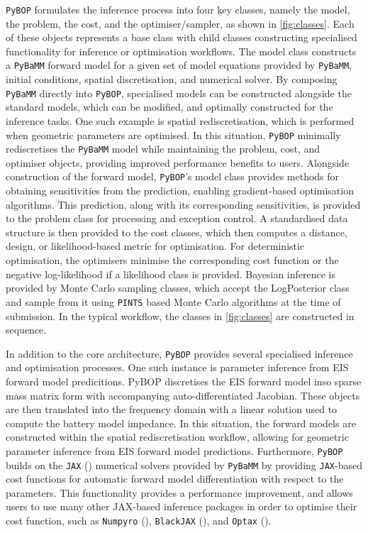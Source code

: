 \documentclass[
]{article}
\begin{document}
\texttt{PyBOP} formulates the inference process into four key classes,
namely the model, the problem, the cost, and the optimiser/sampler, as
shown in \autoref{fig:classes}. Each of these objects represents a base
class with child classes constructing specialised functionality for
inference or optimisation workflows. The model class constructs a
\texttt{PyBaMM} forward model for a given set of model equations
provided by \texttt{PyBaMM}, initial conditions, spatial discretisation,
and numerical solver. By composing \texttt{PyBaMM} directly into
\texttt{PyBOP}, specialised models can be constructed alongside the
standard models, which can be modified, and optimally constructed for
the inference tasks. One such example is spatial rediscretisation, which
is performed when geometric parameters are optimised. In this situation,
\texttt{PyBOP} minimally rediscretises the \texttt{PyBaMM} model while
maintaining the problem, cost, and optimiser objects, providing improved
performance benefits to users. Alongside construction of the forward
model, \texttt{PyBOP}'s model class provides methods for obtaining
sensitivities from the prediction, enabling gradient-based optimisation
algorithms. This prediction, along with its corresponding sensitivities,
is provided to the problem class for processing and exception control. A
standardised data structure is then provided to the cost classes, which
then computes a distance, design, or likelihood-based metric for
optimisation. For deterministic optimisation, the optimisers minimise
the corresponding cost function or the negative log-likelihood if a
likelihood class is provided. Bayesian inference is provided by Monte
Carlo sampling classes, which accept the LogPosterior class and sample
from it using \texttt{PINTS} based Monte Carlo algorithms at the time of
submission. In the typical workflow, the classes in
\autoref{fig:classes} are constructed in sequence.

In addition to the core architecture, \texttt{PyBOP} provides several
specialised inference and optimisation processes. One such instance is
parameter inference from EIS forward model predicitions. PyBOP
discretises the EIS forward model inso sparse mass matrix form with
accompanying auto-differentiated Jacobian. These objects are then
translated into the frequency domain with a linear solution used to
compute the battery model impedance. In this situation, the forward
models are constructed within the spatial rediscretisation workflow,
allowing for geometric parameter inference from EIS forward model
predictions. Furthermore, \texttt{PyBOP} builds on the \texttt{JAX}
() numerical solvers
provided by \texttt{PyBaMM} by providing \texttt{JAX}-based cost
functions for automatic forward model differentiation with respect to
the parameters. This functionality provides a performance improvement,
and allows users to use many other JAX-based inference packages in order
to optimise their cost function, such as \texttt{Numpyro}
(), \texttt{BlackJAX}
(), and \texttt{Optax}
().
\end{document}
